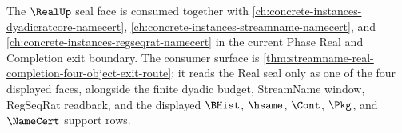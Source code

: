 The $\RealUp$ seal face is consumed together with
\autoref{ch:concrete-instances-dyadicratcore-namecert},
\autoref{ch:concrete-instances-streamname-namecert}, and
\autoref{ch:concrete-instances-regseqrat-namecert} in the current Phase Real
and Completion exit boundary. The consumer surface is
\autoref{thm:streamname-real-completion-four-object-exit-route}: it reads the
Real seal only as one of the four displayed faces, alongside the finite
dyadic budget, StreamName window, RegSeqRat readback, and the displayed
$\BHist$, $\hsame$, $\Cont$, $\Pkg$, and $\NameCert$ support rows.
